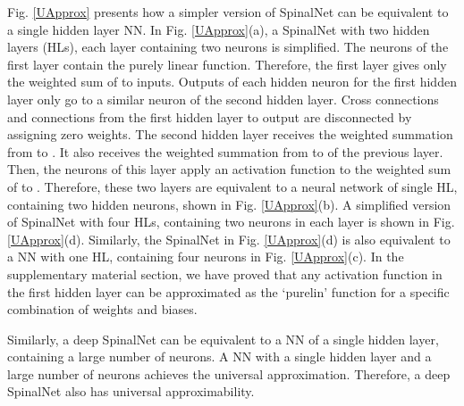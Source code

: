 \documentclass[journal]{IEEEtran}
\begin{document}
Fig. \ref{UApprox} presents how a simpler version of SpinalNet can be equivalent to a single hidden layer NN. In Fig. \ref{UApprox}(a), a SpinalNet with two hidden layers (HLs), each layer containing two neurons is simplified. The neurons of the first layer contain the purely linear function. Therefore, the first layer gives only the weighted sum of  to  inputs. Outputs of each hidden neuron for the first hidden layer only go to a similar neuron of the second hidden layer. Cross connections and connections from the first hidden layer to output are disconnected by assigning zero weights. The second hidden layer receives the weighted summation from  to . It also receives the weighted summation from   to  of the previous layer. Then, the neurons of this layer apply an activation function to the weighted sum of  to . Therefore, these two layers are equivalent to a neural network of single HL, containing two hidden neurons, shown in Fig. \ref{UApprox}(b). A simplified version of SpinalNet with four HLs, containing two neurons in each layer is shown in Fig. \ref{UApprox}(d). Similarly, the SpinalNet in Fig. \ref{UApprox}(d) is also equivalent to a NN with one HL, containing four neurons in Fig. \ref{UApprox}(c). In the supplementary material section, we have proved that any activation function in the first hidden layer can be approximated as the `purelin' function for a specific combination of weights and biases.

Similarly, a deep SpinalNet can be equivalent to a NN of a single hidden layer, containing a large number of neurons.  A NN with a single hidden layer and a large number of neurons achieves the universal approximation. Therefore, a deep SpinalNet also has universal approximability.
\end{document}
